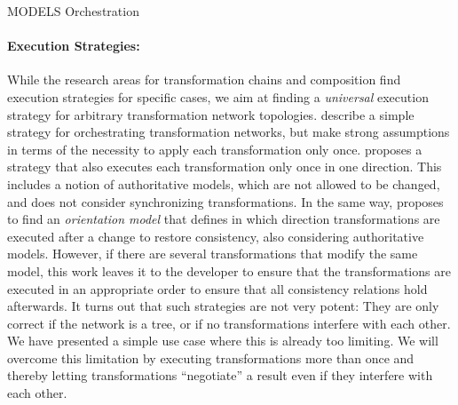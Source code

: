 \begin{copiedFrom}{MODELS Orchestration}
\paragraph{Execution Strategies:}
While the research areas for transformation chains and composition find execution strategies for specific cases, we aim at finding a \emph{universal} execution strategy for arbitrary transformation network topologies.
\textcite{dirocco2017ConsistencyRecoveryInteractive-MODELS} describe a simple strategy for orchestrating transformation networks, but make strong assumptions in terms of the necessity to apply each transformation only once.
\textcite{stevens2020BidirectionalTransformationLarge-SoSym} proposes a strategy that also executes each transformation only once in one direction. This includes a notion of authoritative models, which are not allowed to be changed, and does not consider synchronizing transformations.
In the same way, \cite{stevens2020BuildingFromMegamodels-SoSym} proposes to find an \emph{orientation model} that defines in which direction transformations are executed after a change to restore consistency, also considering authoritative models.
However, if there are several transformations that modify the same model, this work leaves it to the developer to ensure that the transformations are executed in an appropriate order to ensure that all consistency relations hold afterwards.
It turns out that such strategies are not very potent:
They are only correct if the network is a tree, or if no transformations interfere with each other.
We have presented a simple use case where this is already too limiting.
We will overcome this limitation by executing transformations more than once and thereby letting transformations \enquote{negotiate} a result even if they interfere with each other.

\end{copiedFrom} %